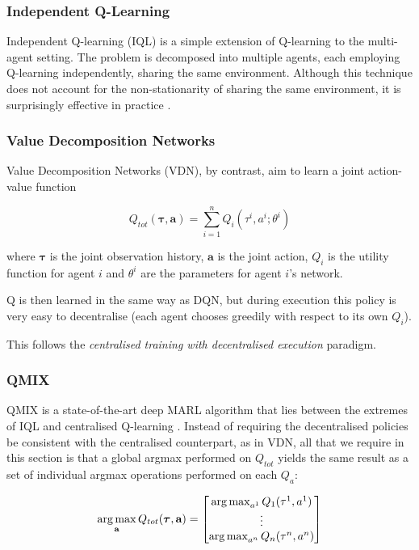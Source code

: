 \subsubsection{Independent Q-Learning}
Independent Q-learning \cite{IQL} (IQL) is a simple extension of Q-learning to the multi-agent setting. The problem is decomposed into multiple agents, each employing Q-learning independently, sharing the same environment. Although this technique does not account for the non-stationarity of sharing the same environment, it is surprisingly effective in practice \cite{iqlisgood}. 


\subsubsection{Value Decomposition Networks}
Value Decomposition Networks \cite{vdn} (VDN), by contrast, aim to learn a joint action-value function

\[Q_{tot}(\boldsymbol{\tau}, \textbf{a}) = \sum_{i=1}^{n} Q_i(\tau^i,a^i;\theta^i) \]

where $\boldsymbol{\tau}$ is the joint observation history, $\textbf{a}$ is the joint action, $Q_i$ is the utility function for agent $i$ and $\theta^i$ are the parameters for agent $i$'s network.

Q is then learned in the same way as DQN, but during execution this policy is very easy to decentralise (each agent chooses greedily with respect to its own $Q_i$).

This follows the \textit{centralised training with decentralised execution} paradigm.

\subsubsection{QMIX}
QMIX is a state-of-the-art deep MARL algorithm that lies between the extremes of IQL and centralised Q-learning \cite{qmixcite}. Instead of requiring the decentralised policies be consistent with the centralised counterpart, as in VDN, all that we require in this section is that a global argmax performed on $Q_{tot}$ yields
the same result as a set of individual argmax operations
performed on each $Q_a$:

\[\operatorname*{arg\,max}_{\textbf{a}}Q_{tot}(\boldsymbol{\tau},\textbf{a}) = \begin{bmatrix}
        \operatorname*{arg\,max}_{a^1}Q_1(\tau^1,a^1) \\
        \vdots\\
        \operatorname*{arg\,max}_{a^n}Q_n(\tau^n,a^n)
    \end{bmatrix}\]







